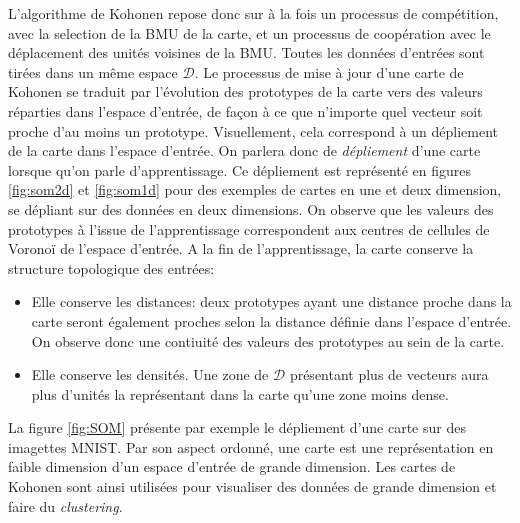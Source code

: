 \documentclass[../main]{subfiles}
\begin{document}
L'algorithme de Kohonen repose donc sur à la fois un processus de compétition, avec la selection de la BMU de la carte, et un processus de coopération avec le déplacement des unités voisines de la BMU.
Toutes les données d'entrées sont tirées dans un même espace $\mathcal{D}$.
Le processus de mise à jour d'une carte de Kohonen se traduit par l'évolution des prototypes de la carte vers des valeurs réparties dans l'espace d'entrée, de façon à ce que n'importe quel vecteur soit proche d'au moins un prototype.
Visuellement, cela correspond à un dépliement de la carte dans l'espace d'entrée. On parlera donc de \emph{dépliement} d'une carte lorsque qu'on parle d'apprentissage. Ce dépliement est représenté en figures \ref{fig:som2d} et \ref{fig:som1d} pour des exemples de cartes en une et deux dimension, se dépliant sur des données en deux dimensions. 
On observe que les valeurs des prototypes à l'issue de l'apprentissage correspondent aux centres de cellules de Voronoï de l'espace d'entrée.
A la fin de l'apprentissage, la carte conserve la structure topologique des entrées:
\begin{itemize}
\item Elle conserve les distances: deux prototypes ayant une distance proche dans la carte seront également proches selon la distance définie dans l'espace d'entrée. On observe donc une contiuité des valeurs des prototypes au sein de la carte.
\item Elle conserve les densités. Une zone de $\mathcal{D}$ présentant plus de vecteurs aura plus d'unités la représentant dans la carte qu'une zone moins dense.
\end{itemize}
La figure \ref{fig:SOM} présente par exemple le dépliement d'une carte sur des imagettes MNIST.
Par son aspect ordonné, une carte est une représentation en faible dimension d'un espace d'entrée de grande dimension. Les cartes de Kohonen sont ainsi utilisées pour visualiser des données de grande dimension et faire du \emph{clustering}. 


\end{document}
